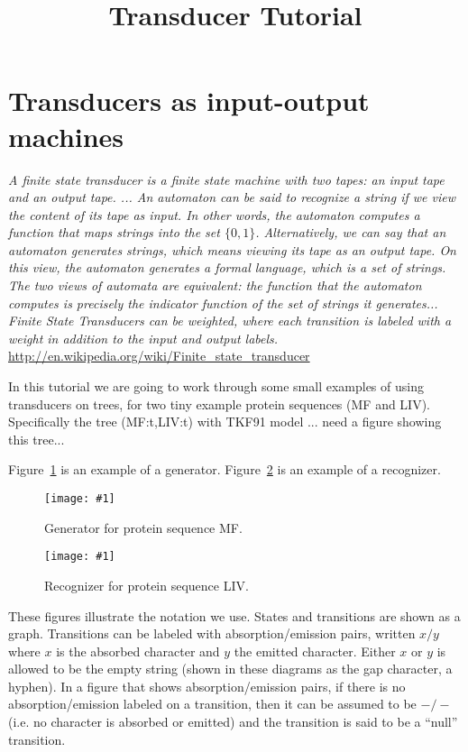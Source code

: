 \documentclass{article}
\newcommand{\figref}[1]{Figure~\ref{Figures.#1}}
\newcommand{\figlabel}[1]{\label{Figures.#1}}
\newcommand{\easyfig}[3]{
\begin{figure}
\texttt{[image: \#1]}
\caption{ \figlabel{#2} #3}
\end{figure}}
\newcommand{\pdffig}[2]{\easyfig{#1.pdf}{#1}{#2}}
\begin{document}
\title{Transducer Tutorial}
\date{}
\maketitle

\section{Transducers as input-output machines}

{\em A finite state transducer is a finite state machine with two tapes: an input tape and an output tape. ... An automaton can be said to recognize a string if we view the content of its tape as input. In other words, the automaton computes a function that maps strings into the set $\{0,1\}$. Alternatively, we can say that an automaton generates strings, which means viewing its tape as an output tape. On this view, the automaton generates a formal language, which is a set of strings. The two views of automata are equivalent: the function that the automaton computes is precisely the indicator function of the set of strings it generates... Finite State Transducers can be weighted, where each transition is labeled with a weight in addition to the input and output labels. }
\url{http://en.wikipedia.org/wiki/Finite_state_transducer}

In this tutorial we are going to work through some small examples of using transducers on trees,
for two tiny example protein sequences (MF and LIV).
Specifically the tree (MF:t,LIV:t) with TKF91 model ... need a figure showing this tree...

\figref{mf-generator} is an example of a generator.
\figref{liv-small} is an example of a recognizer.

\pdffig{mf-generator}{Generator for protein sequence MF.}

\pdffig{liv-small}{Recognizer for protein sequence LIV.}

These figures illustrate the notation we use.
States and transitions are shown as a graph.
Transitions can be labeled with absorption/emission pairs,
written $x/y$ where $x$ is the absorbed character and $y$ the emitted character.
Either $x$ or $y$ is allowed to be the empty string (shown in these diagrams as the gap character, a hyphen).
In a figure that shows absorption/emission pairs,
if there is no absorption/emission labeled on a transition, then it can be assumed to be $-/-$
(i.e. no character is absorbed or emitted) and the transition is said to be a ``null'' transition.
\end{document}
